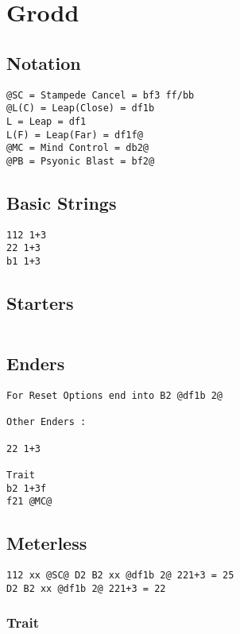 \documentclass[main.tex]{subfiles}
\begin{document}
\chapter{Grodd}

\section{Notation}
\begin{lstlisting}[language=FG]
@SC = Stampede Cancel = bf3 ff/bb
@L(C) = Leap(Close) = df1b
L = Leap = df1
L(F) = Leap(Far) = df1f@
@MC = Mind Control = db2@
@PB = Psyonic Blast = bf2@
\end{lstlisting}


\section{Basic Strings}

\begin{lstlisting}[language=FG]
112 1+3
22 1+3
b1 1+3
\end{lstlisting}

\section{Starters}
\begin{lstlisting}[language=FG]

\end{lstlisting}

\section{Enders}

\begin{lstlisting}[language=FG]
For Reset Options end into B2 @df1b 2@ 

Other Enders :

22 1+3

Trait
b2 1+3f
f21 @MC@
\end{lstlisting}

\section{Meterless}


\begin{lstlisting}[language=FG]
112 xx @SC@ D2 B2 xx @df1b 2@ 221+3 = 25
D2 B2 xx @df1b 2@ 221+3 = 22
\end{lstlisting}

\subsection{Trait}
\end{document}

